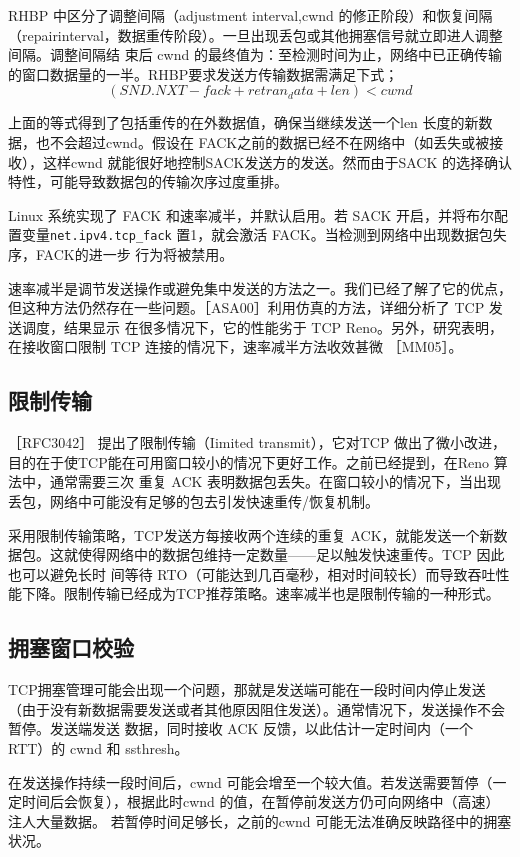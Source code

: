 RHBP 中区分了调整间隔（adjustment interval,cwnd 的修正阶段）和恢复间隔（repairinterval，数据重传阶段）。一旦出现丢包或其他拥塞信号就立即进人调整间隔。调整间隔结
束后 cwnd 的最终值为：至检测时间为止，网络中已正确传输的窗口数据量的一半。RHBP要求发送方传输数据需满足下式；
\begin{equation}
    (SND.NXT - fack + retran_ data + len) < cwnd
\end{equation}

上面的等式得到了包括重传的在外数据值，确保当继续发送一个len 长度的新数据，也不会超过cwnd。假设在 FACK之前的数据已经不在网络中（如丢失或被接收），这样cwnd
就能很好地控制SACK发送方的发送。然而由于SACK 的选择确认特性，可能导致数据包的传输次序过度重排。

Linux 系统实现了 FACK 和速率减半，并默认启用。若 SACK 开启，并将布尔配置变量\verb|net.ipv4.tcp_fack| 置1，就会激活 FACK。当检测到网络中出现数据包失序，FACK的进一步
行为将被禁用。

速率减半是调节发送操作或避免集中发送的方法之一。我们已经了解了它的优点，但这种方法仍然存在一些问题。［ASA00］利用仿真的方法，详细分析了 TCP 发送调度，结果显示
在很多情况下，它的性能劣于 TCP Reno。另外，研究表明，在接收窗口限制 TCP 连接的情况下，速率减半方法收效甚微 ［MM05］。

\subsection{限制传输}
［RFC3042］ 提出了限制传输（Iimited transmit），它对TCP 做出了微小改进，目的在于使TCP能在可用窗口较小的情况下更好工作。之前已经提到，在Reno 算法中，通常需要三次
重复 ACK 表明数据包丢失。在窗口较小的情况下，当出现丢包，网络中可能没有足够的包去引发快速重传/恢复机制。

采用限制传输策略，TCP发送方每接收两个连续的重复 ACK，就能发送一个新数据包。这就使得网络中的数据包维持一定数量——足以触发快速重传。TCP 因此也可以避免长时
间等待 RTO（可能达到几百毫秒，相对时间较长）而导致吞吐性能下降。限制传输已经成为TCP推荐策略。速率减半也是限制传输的一种形式。

\subsection{拥塞窗口校验}
TCP拥塞管理可能会出现一个问题，那就是发送端可能在一段时间内停止发送（由于没有新数据需要发送或者其他原因阻住发送）。通常情况下，发送操作不会暂停。发送端发送
数据，同时接收 ACK 反馈，以此估计一定时间内（一个 RTT）的 cwnd 和 ssthresh。

在发送操作持续一段时间后，cwnd 可能会增至一个较大值。若发送需要暂停（一定时间后会恢复），根据此时cwnd 的值，在暂停前发送方仍可向网络中（高速）注人大量数据。
若暂停时间足够长，之前的cwnd 可能无法准确反映路径中的拥塞状况。

